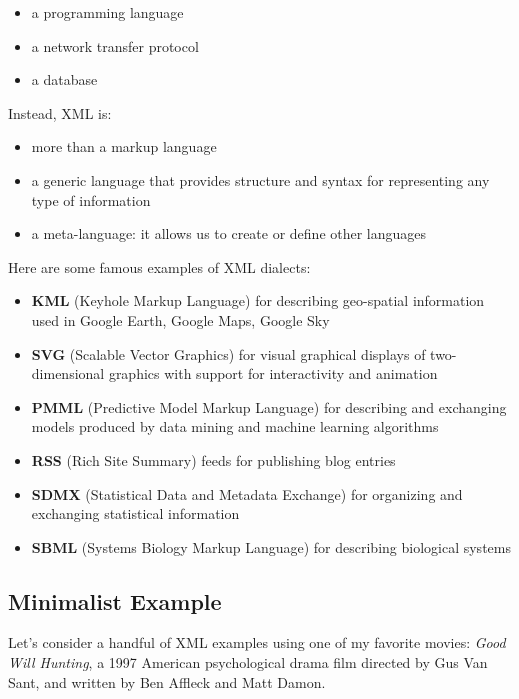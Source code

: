 \documentclass[
]{book}
\providecommand{\tightlist}{%
  \setlength{\itemsep}{0pt}\setlength{\parskip}{0pt}}
\begin{document}
\begin{itemize}
\tightlist
\item
  a programming language
\item
  a network transfer protocol
\item
  a database
\end{itemize}

Instead, XML is:

\begin{itemize}
\tightlist
\item
  more than a markup language
\item
  a generic language that provides structure and syntax for representing any
  type of information
\item
  a meta-language: it allows us to create or define other languages
\end{itemize}

Here are some famous examples of XML dialects:

\begin{itemize}
\item
  \textbf{KML} (Keyhole Markup Language) for describing geo-spatial information used
  in Google Earth, Google Maps, Google Sky
\item
  \textbf{SVG} (Scalable Vector Graphics) for visual graphical displays of
  two-dimensional graphics with support for interactivity and animation
\item
  \textbf{PMML} (Predictive Model Markup Language) for describing and exchanging
  models produced by data mining and machine learning algorithms
\item
  \textbf{RSS} (Rich Site Summary) feeds for publishing blog entries
\item
  \textbf{SDMX} (Statistical Data and Metadata Exchange) for organizing and
  exchanging statistical information
\item
  \textbf{SBML} (Systems Biology Markup Language) for describing biological systems
\end{itemize}

\hypertarget{minimalist-example}{%
\subsection{Minimalist Example}\label{minimalist-example}}

Let's consider a handful of XML examples using one of my favorite movies:
\emph{Good Will Hunting}, a 1997 American psychological drama film directed by Gus
Van Sant, and written by Ben Affleck and Matt Damon.
\end{document}
